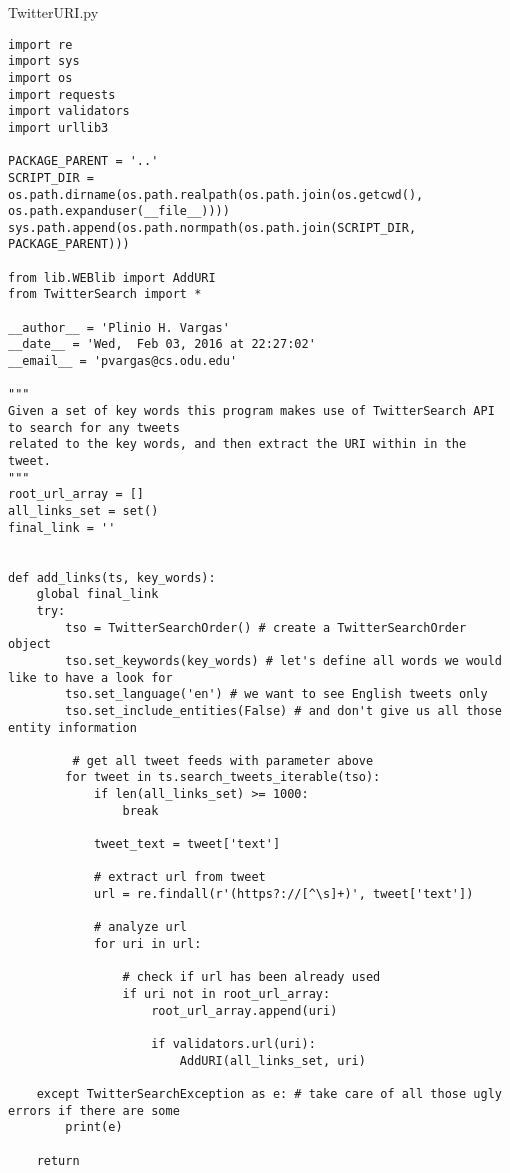 \begin{center}
	TwitterURI.py\\
\end{center}
\begin{lstlisting}[style=numbers]
import re
import sys
import os
import requests
import validators
import urllib3

PACKAGE_PARENT = '..'
SCRIPT_DIR = os.path.dirname(os.path.realpath(os.path.join(os.getcwd(), os.path.expanduser(__file__))))
sys.path.append(os.path.normpath(os.path.join(SCRIPT_DIR, PACKAGE_PARENT)))

from lib.WEBlib import AddURI
from TwitterSearch import *

__author__ = 'Plinio H. Vargas'
__date__ = 'Wed,  Feb 03, 2016 at 22:27:02'
__email__ = 'pvargas@cs.odu.edu'

"""
Given a set of key words this program makes use of TwitterSearch API to search for any tweets
related to the key words, and then extract the URI within in the tweet.
"""
root_url_array = []
all_links_set = set()
final_link = ''


def add_links(ts, key_words):
    global final_link
    try:
        tso = TwitterSearchOrder() # create a TwitterSearchOrder object
        tso.set_keywords(key_words) # let's define all words we would like to have a look for
        tso.set_language('en') # we want to see English tweets only
        tso.set_include_entities(False) # and don't give us all those entity information

         # get all tweet feeds with parameter above
        for tweet in ts.search_tweets_iterable(tso):
            if len(all_links_set) >= 1000:
                break

            tweet_text = tweet['text']

            # extract url from tweet
            url = re.findall(r'(https?://[^\s]+)', tweet['text'])

            # analyze url
            for uri in url:

                # check if url has been already used
                if uri not in root_url_array:
                    root_url_array.append(uri)

                    if validators.url(uri):
                        AddURI(all_links_set, uri)

    except TwitterSearchException as e: # take care of all those ugly errors if there are some
        print(e)

    return


\end{lstlisting}
